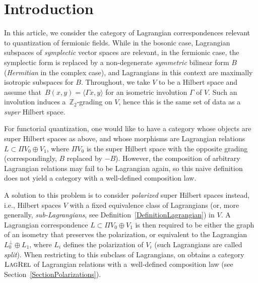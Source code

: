 \documentclass[pdftex]{sigma}
\numberwithin{equation}{section}
\newcommand{\LagRel}{\textsc{LagRel}}
\newcommand{\Z}{\mathbb{Z}}
\begin{document}
\section{Introduction}

In this article, we consider the category of Lagrangian correspondences relevant to quantization of fermionic fields.
While in the bosonic case, Lagrangian subspaces of \emph{symplectic} vector spaces are relevant, in the fermionic case, the symplectic form is replaced by a non-degenerate \emph{symmetric} bilinear form $B$ (\emph{Hermitian} in the complex case), and Lagrangians in this context are maximally isotropic subspaces for $B$.
Throughout, we take $V$ to be a Hilbert space and assume that~${B(x, y) = \langle \Gamma x, y\rangle}$ for an isometric involution $\Gamma$ of $V$.
Such an involution induces a~$\Z_2$-grading on $V$, hence this is the same set of data as a \emph{super} Hilbert space.

For functorial quantization, one would like to have a category whose objects are super Hilbert spaces as above, and whose morphisms are Lagrangian relations $L \subset \Pi V_0 \oplus V_1$, where $\Pi V_0$ is the super Hilbert space with the opposite grading (correspondingly, $B$ replaced by $-B$).
However, the composition of arbitrary Lagrangian relations may fail to be Lagrangian again, so this naive definition does not yield a category with a well-defined composition law.

A solution to this problem is to consider \emph{polarized} super Hilbert spaces instead, i.e., Hilbert spaces $V$ with a fixed equivalence class of Lagrangians (or, more generally, \emph{sub-Lagrangians}, see Definition~\ref{DefinitionLagrangian}) in $V$.
A Lagrangian correspondence $L \subset \Pi V_0 \oplus V_1$ is then required to be either the graph of an isometry that preserves the polarization, or equivalent to the Lagrangian $L_0^\perp \oplus L_1$, where $L_i$ defines the polarization of $V_i$ (such Lagrangians are called \emph{split}).
When restricting to this subclass of Lagrangians, on obtains a category $\LagRel$ of Lagrangian relations with a~well-defined composition law (see Section~\ref{SectionPolarizations}).
\end{document}
